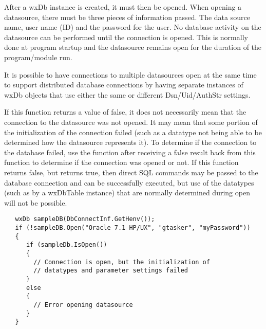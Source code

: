 
After a wxDb instance is created, it must then be opened.  When opening a
datasource, there must be three pieces of information passed.  The data
source name, user name (ID) and the password for the user.  No database
activity on the datasource can be performed until the connection is opened.
This is normally done at program startup and the datasource remains
open for the duration of the program/module run.

It is possible to have connections to multiple datasources open at the same
time to support distributed database connections by having separate instances
of wxDb objects that use either the same or different Dsn/Uid/AuthStr settings.

If this function returns a value of false, it does not necessarily mean that
the connection to the datasource was not opened.  It may mean that some
portion of the initialization of the connection failed (such as a datatype not
being able to be determined how the datasource represents it).  To determine
if the connection to the database failed, use the 
function after receiving a false result back from this function to determine if
the connection was opened or not.  If this function returns false, but 
returns true, then direct SQL commands may be passed to the database
connection and can be successfully executed, but use of the datatypes (such as
by a wxDbTable instance) that are normally determined during open will not be
possible.



\begin{verbatim}
   wxDb sampleDB(DbConnectInf.GetHenv());
   if (!sampleDB.Open("Oracle 7.1 HP/UX", "gtasker", "myPassword"))
   {
      if (sampleDb.IsOpen())
      {
        // Connection is open, but the initialization of
        // datatypes and parameter settings failed
      }
      else
      {
        // Error opening datasource
      }
   }
\end{verbatim}

\label{wxdbrollbacktrans}



